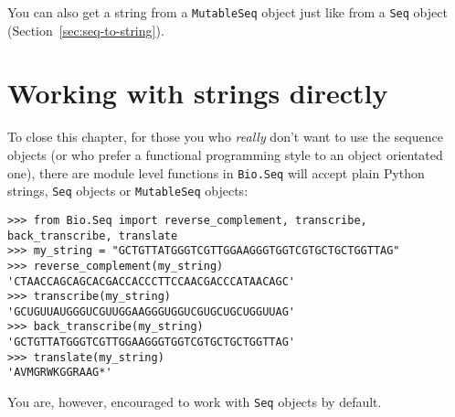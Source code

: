 You can also get a string from a \verb|MutableSeq| object just like from a \verb|Seq| object (Section~\ref{sec:seq-to-string}).

\section{Working with strings directly}
\label{sec:seq-module-functions}
To close this chapter, for those you who \emph{really} don't want to use the sequence
objects (or who prefer a functional programming style to an object orientated one),
there are module level functions in \verb|Bio.Seq| will accept plain Python strings,
\verb|Seq| objects or \verb|MutableSeq| objects:

\begin{verbatim}
>>> from Bio.Seq import reverse_complement, transcribe, back_transcribe, translate
>>> my_string = "GCTGTTATGGGTCGTTGGAAGGGTGGTCGTGCTGCTGGTTAG"
>>> reverse_complement(my_string)
'CTAACCAGCAGCACGACCACCCTTCCAACGACCCATAACAGC'
>>> transcribe(my_string)
'GCUGUUAUGGGUCGUUGGAAGGGUGGUCGUGCUGCUGGUUAG'
>>> back_transcribe(my_string)
'GCTGTTATGGGTCGTTGGAAGGGTGGTCGTGCTGCTGGTTAG'
>>> translate(my_string)
'AVMGRWKGGRAAG*'
\end{verbatim}

\noindent You are, however, encouraged to work with \verb|Seq| objects by default.

